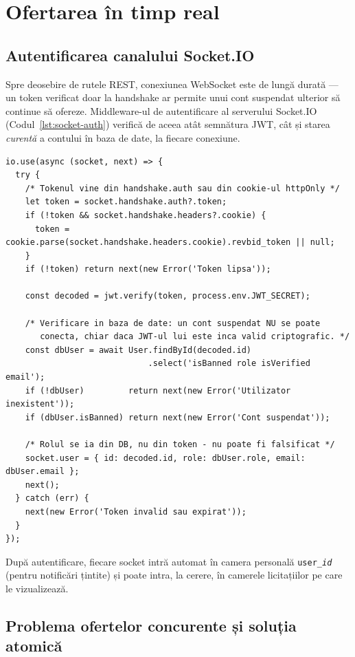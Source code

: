 \section{Ofertarea în timp real}

\subsection{Autentificarea canalului Socket.IO}

Spre deosebire de rutele REST, conexiunea WebSocket este de lungă durată --- un token verificat doar la handshake ar permite unui cont suspendat ulterior să continue să ofereze. Middleware-ul de autentificare al serverului Socket.IO (Codul~\ref{lst:socket-auth}) verifică de aceea atât semnătura JWT, cât și starea \textit{curentă} a contului în baza de date, la fiecare conexiune.

\begin{lstlisting}[caption={Autentificarea conexiunilor Socket.IO (server/sockets/bidSocket.js)},label={lst:socket-auth}]
io.use(async (socket, next) => {
  try {
    /* Tokenul vine din handshake.auth sau din cookie-ul httpOnly */
    let token = socket.handshake.auth?.token;
    if (!token && socket.handshake.headers?.cookie) {
      token = cookie.parse(socket.handshake.headers.cookie).revbid_token || null;
    }
    if (!token) return next(new Error('Token lipsa'));

    const decoded = jwt.verify(token, process.env.JWT_SECRET);

    /* Verificare in baza de date: un cont suspendat NU se poate
       conecta, chiar daca JWT-ul lui este inca valid criptografic. */
    const dbUser = await User.findById(decoded.id)
                             .select('isBanned role isVerified email');
    if (!dbUser)         return next(new Error('Utilizator inexistent'));
    if (dbUser.isBanned) return next(new Error('Cont suspendat'));

    /* Rolul se ia din DB, nu din token - nu poate fi falsificat */
    socket.user = { id: decoded.id, role: dbUser.role, email: dbUser.email };
    next();
  } catch (err) {
    next(new Error('Token invalid sau expirat'));
  }
});
\end{lstlisting}

După autentificare, fiecare socket intră automat în camera personală \texttt{user\_\textit{id}} (pentru notificări țintite) și poate intra, la cerere, în camerele licitațiilor pe care le vizualizează.

\subsection{Problema ofertelor concurente și soluția atomică}
\label{sec:atomic}

